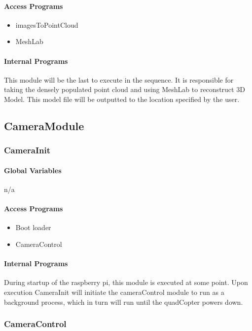 \documentclass[10pt,letterpaper]{article}
\begin{document}
\paragraph{Access Programs}
\begin{itemize}
	\item imagesToPointCloud
    \item MeshLab
\end{itemize}
\paragraph{Internal Programs}
This module will be the last to execute in the sequence. It is responsible for taking the densely populated point cloud and using MeshLab to reconstruct 3D Model. This model file will be outputted to the location specified by the user.
\newpage

\subsection{CameraModule}

\subsubsection{CameraInit}

\paragraph{Global Variables}


n/a


\paragraph{Access Programs}
\begin{itemize}
\item Boot loader
\item CameraControl
\end{itemize}

\paragraph{Internal Programs}
During startup of the raspberry pi, this module is executed at some point. Upon execution CameraInit will initiate the cameraControl module to run as a background process, which in turn will run until the quadCopter powers down.

\subsubsection{CameraControl}
\end{document}
